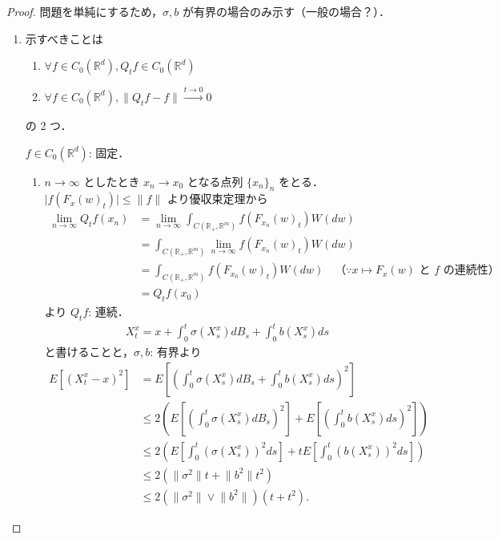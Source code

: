 \documentclass{jsarticle}
\begin{document}
\begin{proof}
    問題を単純にするため，$\sigma, b$ が有界の場合のみ示す（一般の場合？）．
    \begin{enumerate}[label=(\arabic*)]
        \item
        示すべきことは
        \begin{enumerate}[label=(\roman*)]
            \item
            $\forall f\in C_{0}(\mathbb{R}^d), Q_{t}f\in C_{0}(\mathbb{R}^d)$
            \item
            $\forall f\in C_{0}(\mathbb{R}^d), \lVert Q_{t}f-f\rVert\xrightarrow{t\to0}0$
        \end{enumerate}
        の 2 つ．

        $f\in C_{0}(\mathbb{R}^d)$: 固定．
        \begin{enumerate}[label=(\roman*)]
            \item
            $n\to\infty$ としたとき $x_{n}\to x_{0}$ となる点列 $\{x_{n}\}_{n}$ をとる．
            $\lvert f(F_{x}(w)_{t})\rvert\le\lVert f\rVert$ より優収束定理から
            \begin{align}
                \lim_{n\to\infty}Q_{t}f(x_{n})
                &= \lim_{n\to\infty}\int_{C(\mathbb{R_+}, \mathbb{R}^{m})}f(F_{x_{n}}(w)_{t})W(dw) \\
                &= \int_{C(\mathbb{R_+}, \mathbb{R}^{m})}\lim_{n\to\infty}f(F_{x_{n}}(w)_{t})W(dw) \\
                &= \int_{C(\mathbb{R_+}, \mathbb{R}^{m})}f(F_{x_{0}}(w)_{t})W(dw)
                \quad\text{（$\because x\mapsto F_{x}(w)$ と $f$ の連続性）} \\
                &= Q_{t}f(x_{0})
            \end{align}
            より $Q_{t}f$: 連続．
            \begin{align}
                X_{t}^{x}
                = x
                + \int_{0}^{t}\sigma(X_{s}^{x})dB_{s}
                + \int_{0}^{t}b(X_{s}^{x})ds
            \end{align}
            と書けることと，$\sigma, b$: 有界より
            \begin{align}
                E[(X_{t}^{x}-x)^2]
                &= E[(\int_{0}^{t}\sigma(X_{s}^{x})dB_{s}
                + \int_{0}^{t}b(X_{s}^{x})ds)^2] \\
                &\le 2(E[(\int_{0}^{t}\sigma(X_{s}^{x})dB_{s})^2]
                + E[(\int_{0}^{t}b(X_{s}^{x})ds)^2]) \\
                &\le 2(E[\int_{0}^{t}(\sigma(X_{s}^{x}))^{2}ds]
                + tE[\int_{0}^{t}(b(X_{s}^{x}))^{2}ds]) \\
                &\le 2(\lVert \sigma^2\rVert t+\lVert b^2\rVert t^2) \\
                &\le 2(\lVert \sigma^2\rVert\vee\lVert b^2\rVert)(t+t^2).
            \end{align}


\end{enumerate}
\end{enumerate}
\end{proof}
\end{document}

